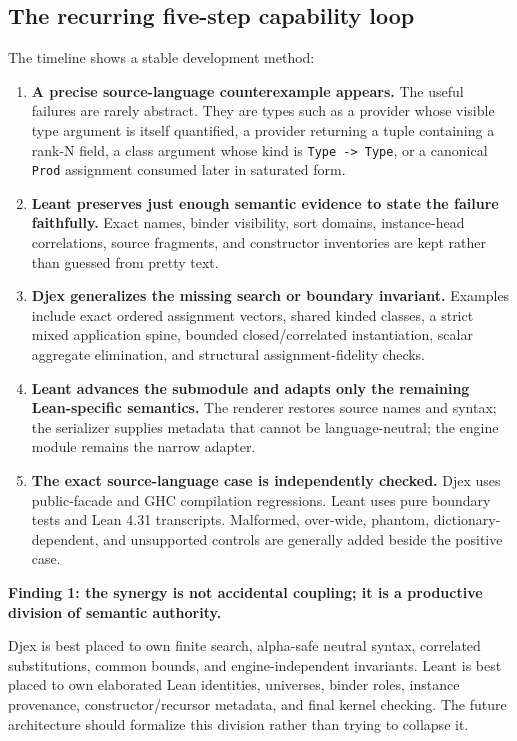 \documentclass[11pt]{article}
\newcommand{\code}[1]{\texttt{#1}}
\newcommand{\Djex}{\textsf{Djex}}
\newcommand{\Leant}{\textsf{Leant}}
\newenvironment{finding}[1]
{\par\medskip\noindent\colorbox{AccentLight}{\parbox{\dimexpr\linewidth-2\fboxsep\relax}{\sffamily\bfseries #1}}\par\smallskip}
{\par\medskip}
\begin{document}
\normalsize

\subsection{The recurring five-step capability loop}

The timeline shows a stable development method:

\begin{enumerate}
  \item \textbf{A precise source-language counterexample appears.}
    The useful failures are rarely abstract.  They are types such as a provider
    whose visible type argument is itself quantified, a provider returning a
    tuple containing a rank-N field, a class argument whose kind is
    \code{Type -> Type}, or a canonical \code{Prod} assignment consumed later
    in saturated form.

  \item \textbf{Leant preserves just enough semantic evidence to state the
    failure faithfully.}
    Exact names, binder visibility, sort domains, instance-head correlations,
    source fragments, and constructor inventories are kept rather than guessed
    from pretty text.

  \item \textbf{Djex generalizes the missing search or boundary invariant.}
    Examples include exact ordered assignment vectors, shared kinded classes,
    a strict mixed application spine, bounded closed/correlated instantiation,
    scalar aggregate elimination, and structural assignment-fidelity checks.

  \item \textbf{Leant advances the submodule and adapts only the remaining
    Lean-specific semantics.}
    The renderer restores source names and syntax; the serializer supplies
    metadata that cannot be language-neutral; the engine module remains the
    narrow adapter.

  \item \textbf{The exact source-language case is independently checked.}
    \Djex{} uses public-facade and GHC compilation regressions.  \Leant{} uses
    pure boundary tests and Lean 4.31 transcripts.  Malformed, over-wide,
    phantom, dictionary-dependent, and unsupported controls are generally
    added beside the positive case.
\end{enumerate}

\begin{finding}{Finding 1: the synergy is not accidental coupling; it is a productive division of semantic authority.}
\Djex{} is best placed to own finite search, alpha-safe neutral syntax,
correlated substitutions, common bounds, and engine-independent invariants.
\Leant{} is best placed to own elaborated Lean identities, universes, binder
roles, instance provenance, constructor/recursor metadata, and final kernel
checking.  The future architecture should formalize this division rather than
trying to collapse it.
\end{finding}
\end{document}
